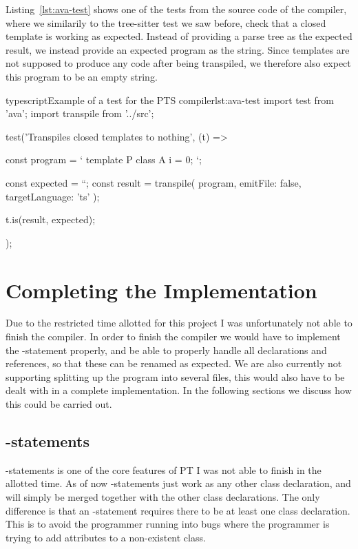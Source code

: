 Listing~\vref{lst:ava-test} shows one of the tests from the source code of the compiler, where we similarily to the tree-sitter test we saw before, check that a closed template is working as expected.
Instead of providing a parse tree as the expected result, we instead provide an expected program as the string.
Since templates are not supposed to produce any code after being transpiled, we therefore also expect this program to be an empty string.

\begin{code}{typescript}{Example of a test for the PTS compiler}{lst:ava-test}
    import test from 'ava';
    import transpile from '../src';

    test('Transpiles closed templates to nothing', (t) => {
        const program = `
    template P {
        class A {
            i = 0;
        }
    }
    `;

        const expected = ``;
        const result = transpile(
            program,
            { emitFile: false, targetLanguage: 'ts' }
        );

        t.is(result, expected);
    });
\end{code}

\section{Completing the Implementation}\label{sec:completing-the-implementation}

Due to the restricted time allotted for this project I was unfortunately not able to finish the compiler.
In order to finish the compiler we would have to implement the -statement properly, and be able to properly handle all declarations and references, so that these can be renamed as expected.
We are also currently not supporting splitting up the program into several files, this would also have to be dealt with in a complete implementation.
In the following sections we discuss how this could be carried out.

\subsection{-statements}\label{subsec:addto-statements}

-statements is one of the core features of PT I was not able to finish in the allotted time.
As of now -statements just work as any other class declaration, and will simply be merged together with the other class declarations.
The only difference is that an -statement requires there to be at least one class declaration.
This is to avoid the programmer running into bugs where the programmer is trying to add attributes to a non-existent class.

